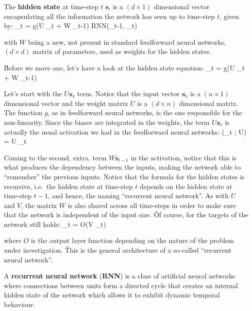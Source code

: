 The \textbf{hidden state} at time-step $t$ $\boldsymbol{s}_{t}$ is a $(d \times 1)$ dimensional vector encapsulating
all the information the network has seen up to time-step $t$, given by:
\bse
{}_{t} = g(U _{t} + W _{t-1}) \coloneqq RNN(_{t-1},
_{t})
\ese

with $W$ being a new, not present in standard feedforward neural networks, $(d \times d)$ matrix of parameters, used as
weights for the hidden states.
\ed


\v

Before we move one, let's have a look at the hidden state equation:
\bse
{}_{t} = g(U _{t} + W _{t-1})
\ese

Let's start with the $U \boldsymbol{x}_{t}$ term. Notice that the input vector $\boldsymbol{x}_{t}$ is a $(n \times 1
)$ dimensional vector and the weight matrix $U$ is a $(d\times n)$ dimensional matrix. The function $g$, as in
feedforward neural networks, is the one responsible for the non-linearity. Since the biases are integrated in the
weights, the term $U \boldsymbol{x}_{t}$ is actually the usual activation we had in the feedforward neural networks:
\bse
{}(_{t} ; U) = U _{t}
\ese

Coming to the second, extra, term $W \boldsymbol{s}_{t-1}$ in the activation, notice that this is what produces the
dependency between the inputs, making the network able to ``remember'' the previous inputs. Notice that the formula
for the hidden states is recursive, i.e.\ the hidden state at time-step $t$ depends on the hidden state at time-step
$t-1$, and hence, the naming ``recurrent neural network''. As with $U$ and $V$, the matrix $W$ is also shared across all
time-steps in order to make sure that the network is independent of the input size. \v

Of course, for the targets of the network still holds:
\bse
{}_t = O(V _{t})
\ese

where $O$ is the output layer function depending on the nature of the problem under investigation. \v

This is the general architecture of a so-called ``recurrent neural network''.

A \textbf{recurrent neural network} (\textbf{RNN}) is a class of artificial neural networks where connections between
units form a directed cycle that creates an internal hidden state of the network which allows it to exhibit dynamic temporal
behaviour.
\ed

